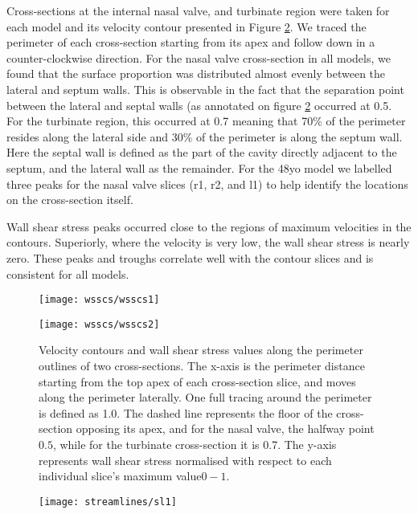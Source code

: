 Cross-sections at the internal nasal valve, and turbinate region were taken for each model and its velocity contour presented in Figure \ref{fig:wcs}. We traced the perimeter of each cross-section starting from its apex and follow down in a counter-clockwise direction. For the nasal valve cross-section in all models, we found that the surface proportion was distributed almost evenly between the lateral and septum walls. This is observable in the fact that the separation point between the lateral and septal walls (as annotated on figure \ref{fig:wcs} occurred at 0.5. For the turbinate region, this occurred at 0.7 meaning that 70\% of the perimeter resides along the lateral side and 30\% of the perimeter is along the septum wall. Here the septal wall is defined as the part of the cavity directly adjacent to the septum, and the lateral wall as the remainder. For the 48yo model we labelled three peaks for the nasal valve slices (r1, r2, and l1) to help identify the locations on the cross-section itself. 

Wall shear stress peaks occurred close to the regions of maximum velocities in the contours. Superiorly, where the velocity is very low, the wall shear stress is nearly zero. These peaks and troughs correlate well with the contour slices and is consistent for all models.

\begin{figure} 
  \texttt{[image: wsscs/wsscs1]}
  \label{fig:wcs}
\end{figure}

\begin{figure} 
  \texttt{[image: wsscs/wsscs2]}
  \caption{Velocity contours and wall shear stress values along the perimeter outlines of two cross-sections. The x-axis is the perimeter distance starting from the top apex of each cross-section slice, and moves along the perimeter laterally. One full tracing around the perimeter is defined as 1.0. The dashed line represents the floor of the cross-section opposing its apex, and for the nasal valve, the halfway point \(0.5\), while for the turbinate cross-section it is 0.7. The y-axis represents wall shear stress normalised with respect to each individual slice's maximum value\(0 - 1\).}
  \label{fig:wcs}
\end{figure}

\begin{figure} 
  \texttt{[image: streamlines/sl1]}
  \end{figure}

